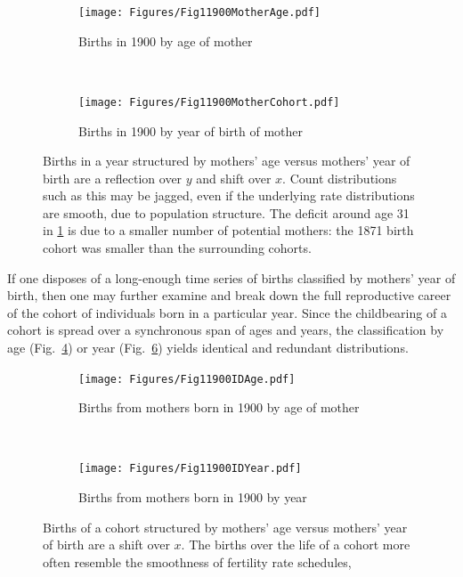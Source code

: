 \documentclass{article}
\begin{document}
\begin{figure}[ht!]
\begin{subfigure}[t]{0.5\textwidth}
        \centering
        \texttt{[image: Figures/Fig11900MotherAge.pdf]}
        \caption{Births in 1900 by age of mother}
        \label{fig:agemother}
\end{subfigure}
~
\begin{subfigure}[t]{0.5\textwidth}
        \centering
        \texttt{[image: Figures/Fig11900MotherCohort.pdf]}
        \caption{Births in 1900 by year of birth of mother}
          \label{fig:cohmother}
\end{subfigure}
\caption{Births in a year structured by mothers' age versus mothers' year of birth are a
reflection over $y$ and shift over $x$. Count distributions such as this may be jagged, even if the underlying rate distributions are smooth, due to population structure. The deficit around age 31 in \ref{fig:agemother} is due to a smaller number of potential mothers: the 1871 birth cohort was smaller than the surrounding cohorts.}
\end{figure}

If one disposes of a long-enough time series of births classified by mothers' year of birth, then one may further examine and break down the full reproductive career of the cohort of individuals born in a particular year. Since the childbearing of a cohort is spread over a synchronous span of ages and years, the classification by age (Fig.~\ref{fig:age1900mother}) or year (Fig.~\ref{fig:year1900}) yields identical and redundant distributions.

\begin{figure}[ht!]
\begin{subfigure}[t]{0.5\textwidth}
        \centering
        \texttt{[image: Figures/Fig11900IDAge.pdf]}
        \caption{Births from mothers born in 1900 by age of mother}
        \label{fig:age1900mother}
\end{subfigure}
~
\begin{subfigure}[t]{0.5\textwidth}
        \centering
        \texttt{[image: Figures/Fig11900IDYear.pdf]}
        \caption{Births from mothers born in 1900 by year}
          \label{fig:year1900}
\end{subfigure}
\caption{Births of a cohort structured by mothers' age versus mothers' year of birth are a
shift over $x$. The births over the life of a cohort more often resemble the smoothness of fertility rate schedules,}
\end{figure}
\end{document}
